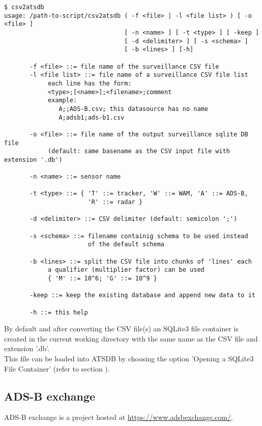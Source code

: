 \begin{verbatim}
$ csv2atsdb
usage: /path-to-script/csv2atsdb ( -f <file> | -l <file list> ) [ -o <file> ]
                                 [ -n <name> ] [ -t <type> ] [ -keep ]
                                 [ -d <delimiter> ] [ -s <schema> ] 
                                 [ -b <lines> ] [-h]

       -f <file> ::= file name of the surveillance CSV file
       -l <file list> ::= file name of a surveillance CSV file list
            each line has the form:
            <type>;[<name>];<filename>;comment
            example:
               A;;ADS-B.csv; this datasource has no name
               A;adsb1;ads-b1.csv

       -o <file> ::= file name of the output surveillance sqlite DB file
            (default: same basename as the CSV input file with extension '.db')

       -n <name> ::= sensor name

       -t <type> ::= { 'T' ::= tracker, 'W' ::= WAM, 'A' ::= ADS-B, 
                       'R' ::= radar }

       -d <delimiter> ::= CSV delimiter (default: semicolon ';')

       -s <schema> ::= filename containig schema to be used instead
                       of the default schema

       -b <lines> ::= split the CSV file into chunks of 'lines' each
            a qualifier (multiplier factor) can be used
            { 'M' ::= 10^6; 'G' ::= 10^9 }

       -keep ::= keep the existing database and append new data to it

       -h ::= this help
\end{verbatim}

By default and after converting the CSV file(s) an SQLite3 file container is created in the current working directory with the same name as the CSV file and extension '.db'. \\

This file can be loaded into ATSDB by choosing the option 'Opening a SQLite3 File Container' (refer to section ).

\subsection{ADS-B exchange}

ADS-B exchange is a project hosted at \url{https://www.adsbexchange.com/}. \\

